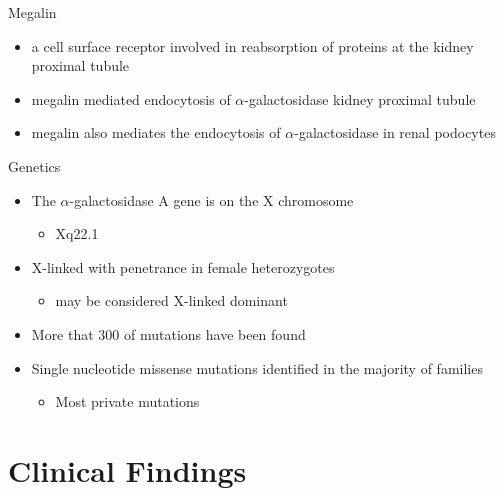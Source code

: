 \documentclass[presentation, smaller]{beamer}
\begin{document}
\begin{frame}[label={sec:orgheadline7}]{Megalin}
\begin{itemize}
\item a cell surface receptor involved in reabsorption of proteins at the kidney proximal tubule
\item megalin mediated endocytosis of \(\alpha\)-galactosidase kidney proximal tubule
\item megalin also mediates the endocytosis of \(\alpha\)-galactosidase in renal podocytes
\end{itemize}
\end{frame}

\begin{frame}[label={sec:orgheadline8}]{Genetics}
\begin{itemize}
\item The \(\alpha\)-galactosidase A gene is on the X chromosome
\begin{itemize}
\item Xq22.1
\end{itemize}
\item X-linked with penetrance in female heterozygotes
\begin{itemize}
\item may be considered X-linked dominant
\end{itemize}
\item More that 300 of mutations have been found
\item Single nucleotide missense mutations identified in the majority of families
\begin{itemize}
\item Most private mutations
\end{itemize}
\end{itemize}
\end{frame}

\section{Clinical Findings}
\label{sec:orgheadline11}
\end{document}
